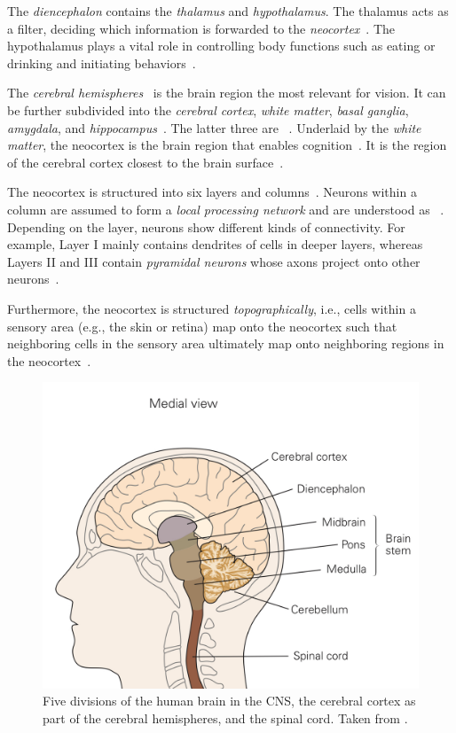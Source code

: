 The \textit{diencephalon} contains the \textit{thalamus} and \textit{hypothalamus}.
The thalamus acts as a filter, deciding which information is forwarded to the \textit{neocortex}~\citep[p. 341]{mack2013principles}.
The hypothalamus plays a vital role in controlling body functions such as eating or drinking and initiating behaviors~\citep[p. 341]{mack2013principles}.

The \textit{cerebral hemispheres}~\citep[p. 341]{mack2013principles} is the brain region the most relevant for vision.
It can be further subdivided into the \textit{cerebral cortex}, \textit{white matter}, \textit{basal ganglia}, \textit{amygdala}, and \textit{hippocampus}~\citep[p. 341]{mack2013principles}.
The latter three are ~\citep[p. 342]{mack2013principles}.
Underlaid by the \textit{white matter}, the neocortex is the brain region that enables cognition~\citep[pp. 341, 392]{mack2013principles}.
It is the region of the cerebral cortex closest to the brain surface~\citep[p. 345]{mack2013principles}.

The neocortex is structured into six layers and columns~\citep[p. 345]{mack2013principles}.
Neurons within a column are assumed to form a \textit{local processing network} and are understood as ~\citep[p. 348]{mack2013principles}.
Depending on the layer, neurons show different kinds of connectivity.
For example, Layer I mainly contains dendrites of cells in deeper layers, whereas Layers II and III contain \textit{pyramidal neurons} whose axons project onto other neurons~\citep[p. 346]{mack2013principles}.

Furthermore, the neocortex is structured \textit{topographically}, i.e., cells within a sensory area (e.g., the skin or retina) map onto the neocortex such that neighboring cells in the sensory area ultimately map onto neighboring regions in the neocortex~\citep[p. 343]{mack2013principles}.

\begin{figure}
    \centering
    \includegraphics[width=.4\textwidth]{images/brain_regions.jpeg}
    \caption[Divisions of the human brain]{Five divisions of the human brain in the \ac{CNS}, the cerebral cortex as part of the cerebral hemispheres, and the spinal cord. Taken from \citet[p. 340]{mack2013principles}.}
    \label{fig:human_brain_divisions}
\end{figure}

